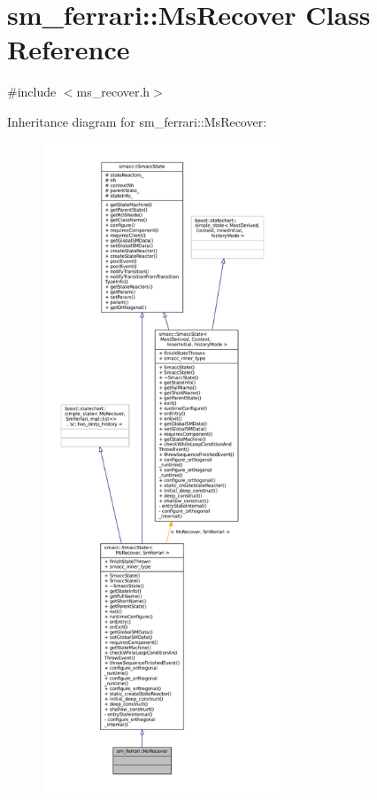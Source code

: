 \hypertarget{classsm__ferrari_1_1MsRecover}{}\section{sm\+\_\+ferrari\+:\+:Ms\+Recover Class Reference}
\label{classsm__ferrari_1_1MsRecover}


{\ttfamily \#include $<$ms\+\_\+recover.\+h$>$}



Inheritance diagram for sm\+\_\+ferrari\+:\+:Ms\+Recover\+:
\nopagebreak
\begin{figure}[H]
\begin{center}
\leavevmode
\includegraphics[height=550pt]{classsm__ferrari_1_1MsRecover__inherit__graph}
\end{center}
\end{figure}


